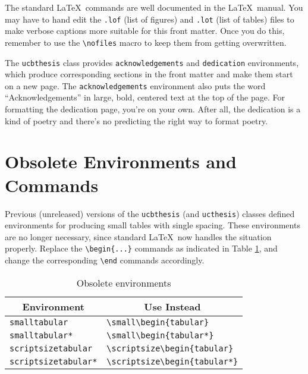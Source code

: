 \documentclass[11pt]{article}
\newcommand*{\pkg}[1]{\texttt{#1}}
\begin{document}
The standard \LaTeX\ commands are well documented in the \LaTeX\ manual.
You may have to hand edit the \texttt{.lof} (list of figures) and
\texttt{.lot} (list of tables) files to make verbose captions more suitable for
this front matter.  Once you do this, remember to use the \verb|\nofiles|
macro to keep them from getting overwritten.

The \pkg{ucbthesis} class provides \texttt{acknowledgements} and
\texttt{dedication} environments, which produce corresponding sections in
the front matter and make them start on a new page.  The
\texttt{acknowledgements}
environment also puts the word ``Acknowledgements'' in large, bold,
centered text at the top of the page.  For formatting the dedication page,
you're on your own.  After all, the dedication is a kind of poetry and
there's no predicting the right way to format poetry.

\section{Obsolete Environments and Commands}

Previous (unreleased) versions of the \pkg{ucbthesis} (and \pkg{ucthesis})
classes defined environments for producing small tables with single spacing.
These environments are no longer necessary, since standard \LaTeX\ now
handles the situation properly.  Replace the \verb!\begin{...}!
commands as indicated in Table \ref{obsolenv}, and change the
corresponding \verb!\end! commands accordingly.

\begin{table}[htbp]
\centering
\begin{tabular}{l l}
  \toprule
  \multicolumn{1}{c}{Environment} & \multicolumn{1}{c}{Use Instead}\\
  \midrule
  \lstinline!smalltabular! & \lstinline!\small\begin{tabular}! \\
  \lstinline!smalltabular*! & \lstinline!\small\begin{tabular*}! \\
  \lstinline!scriptsizetabular! & \lstinline!\scriptsize\begin{tabular}! \\
  \lstinline!scriptsizetabular*! & \lstinline!\scriptsize\begin{tabular*}! \\
  \bottomrule
\end{tabular}
\caption{Obsolete environments}\label{obsolenv}
\end{table}
\end{document}
